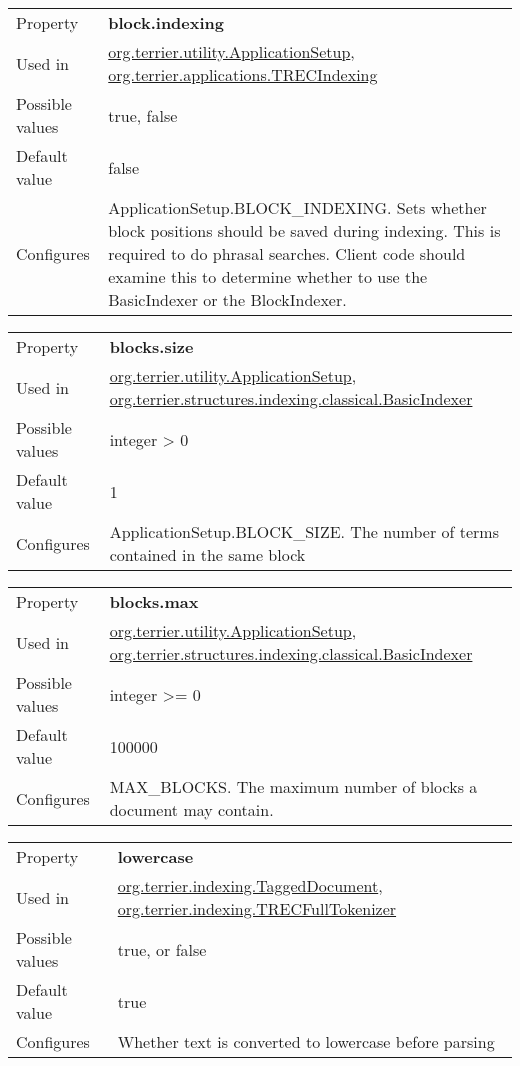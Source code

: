 \begin{longtable}[]{@{}ll@{}}
\toprule
Property & \textbf{block.indexing}\tabularnewline
Used in &
\href{javadoc/org/terrier/utility/ApplicationSetup.html}{org.terrier.utility.ApplicationSetup},
\href{javadoc/org/terrier/applications/TRECIndexing.html}{org.terrier.applications.TRECIndexing}\tabularnewline
Possible values & true, false\tabularnewline
Default value & false\tabularnewline
Configures & ApplicationSetup.BLOCK\_INDEXING. Sets whether block
positions should be saved during indexing. This is required to do
phrasal searches. Client code should examine this to determine whether
to use the BasicIndexer or the BlockIndexer.\tabularnewline
\bottomrule
\end{longtable}

\begin{longtable}[]{@{}ll@{}}
\toprule
Property & \textbf{blocks.size}\tabularnewline
Used in &
\href{javadoc/org/terrier/utility/ApplicationSetup.html}{org.terrier.utility.ApplicationSetup},
\href{javadoc/org/terrier/structures/indexing/classical/BasicIndexer.html}{org.terrier.structures.indexing.classical.BasicIndexer}\tabularnewline
Possible values & integer \textgreater{} 0\tabularnewline
Default value & 1\tabularnewline
Configures & ApplicationSetup.BLOCK\_SIZE. The number of terms contained
in the same block\tabularnewline
\bottomrule
\end{longtable}

\begin{longtable}[]{@{}ll@{}}
\toprule
Property & \textbf{blocks.max}\tabularnewline
Used in &
\href{javadoc/org/terrier/utility/ApplicationSetup.html}{org.terrier.utility.ApplicationSetup},
\href{javadoc/org/terrier/structures/indexing/classical/BasicIndexer.html}{org.terrier.structures.indexing.classical.BasicIndexer}\tabularnewline
Possible values & integer \textgreater{}= 0\tabularnewline
Default value & 100000\tabularnewline
Configures & MAX\_BLOCKS. The maximum number of blocks a document may
contain.\tabularnewline
\bottomrule
\end{longtable}

\begin{longtable}[]{@{}ll@{}}
\toprule
Property & \textbf{lowercase}\tabularnewline
Used in &
\href{javadoc/org/terrier/indexing/TaggedDocument.html}{org.terrier.indexing.TaggedDocument},
\href{javadoc/org/terrier/indexing/TRECFullTokenizer.html}{org.terrier.indexing.TRECFullTokenizer}\tabularnewline
Possible values & true, or false\tabularnewline
Default value & true\tabularnewline
Configures & Whether text is converted to lowercase before
parsing\tabularnewline
\bottomrule
\end{longtable}

